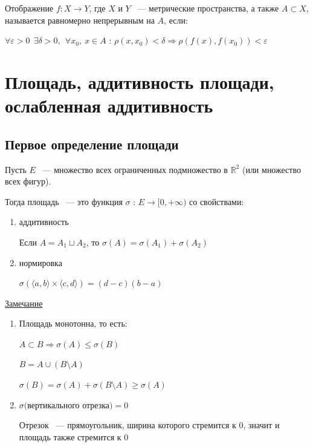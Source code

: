 \documentclass{article}
\begin{document}
		Отображение $f : X \rightarrow Y$, где $X$ и $Y$ ~--- метрические пространства, а также $A \subset X$, называется равномерно непрерывным на $A$, если:
			
		$\forall \varepsilon > 0~~\exists \delta > 0{,}~~\forall x_0{,}~x \in A$ : $\rho(x, x_0) < \delta \Longrightarrow \rho(f(x), f(x_0)) < \varepsilon$
			
	\newpage
		
	\section{Площадь, аддитивность площади, ослабленная аддитивность}
		
		\subsection{Первое определение площади}
			
			Пусть $E$ ~--- множество всех ограниченных подмножество в $\mathbb{R}^2$ (или множество всех фигур).
			
			Тогда площадь ~--- это функция $\sigma$ : $E \rightarrow [0, +\infty)$ со свойствами:
			
			\begin{enumerate}
			
				\item аддитивность
				
					Если $A = A_1 \sqcup A_2$, то $\sigma(A) = \sigma(A_1) + \sigma(A_2)$
				
				\item нормировка
				
					$\sigma(\langle a, b \rangle \times \langle c, d \rangle) = (d - c)(b - a)$ 
		
			\end{enumerate}
			
			\underline{Замечание}
			
                \begin{enumerate}
                
                    \item Площадь монотонна, то есть:	
			
                        $A \subset B \Rightarrow \sigma(A) \leq \sigma(B)$
			
                        $B = A \cup (B \setminus A)$
                        
                        $\sigma(B) = \sigma(A) + \sigma(B \setminus A) \geq \sigma(A)$
                        
                    \item $\sigma($вертикального отрезка$) = 0$
				
                        Отрезок ~--- прямоугольник, ширина которого стремится к $0$, значит и площадь также стремится к $0$
                        
				\end{enumerate}
				
\end{document}
